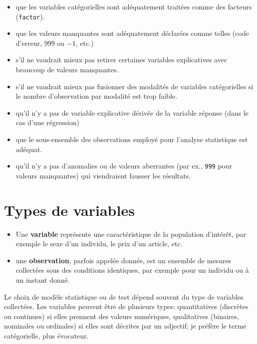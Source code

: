 \documentclass[
  11pt,
  letterpaper,
]{scrbook}
\providecommand{\tightlist}{%
  \setlength{\itemsep}{0pt}\setlength{\parskip}{0pt}}\usepackage{longtable,booktabs,array}
\theoremstyle{definition}
\theoremstyle{remark}
\begin{document}
\begin{itemize}
\tightlist
\item
  que les variables catégorielles sont adéquatement traitées comme des
  facteurs (\texttt{factor}).
\item
  que les valeurs manquantes sont adéquatement déclarées comme telles
  (code d'erreur, 999 ou \(-1\), etc.)
\item
  s'il ne vaudrait mieux pas retirer certaines variables explicatives
  avec beaucoup de valeurs manquantes.
\item
  s'il ne vaudrait mieux pas fusionner des modalités de variables
  catégorielles si le nombre d'observation par modalité est trop faible.
\item
  qu'il n'y a pas de variable explicative dérivée de la variable réponse
  (dans le cas d'une régression)
\item
  que le sous-ensemble des observations employé pour l'analyse
  statistique est adéquat.
\item
  qu'il n'y a pas d'anomalies ou de valeurs aberrantes (par ex.,
  \texttt{999} pour valeurs manquantes) qui viendraient fausser les
  résultats.
\end{itemize}

\hypertarget{types-de-variables}{%
\section{Types de variables}\label{types-de-variables}}

\begin{itemize}
\tightlist
\item
  Une \textbf{variable} représente une caractéristique de la population
  d'intérêt, par exemple le sexe d'un individu, le prix d'un article,
  etc.
\item
  une \textbf{observation}, parfois appelée donnée, est un ensemble de
  mesures collectées sous des conditions identiques, par exemple pour un
  individu ou à un instant donné.
\end{itemize}

Le choix de modèle statistique ou de test dépend souvent du type de
variables collectées. Les variables peuvent être de plusieurs types:
quantitatives (discrètes ou continues) si elles prennent des valeurs
numériques, qualitatives (binaires, nominales ou ordinales) si elles
sont décrites par un adjectif; je préfère le terme catégorielle, plus
évocateur.
\end{document}
